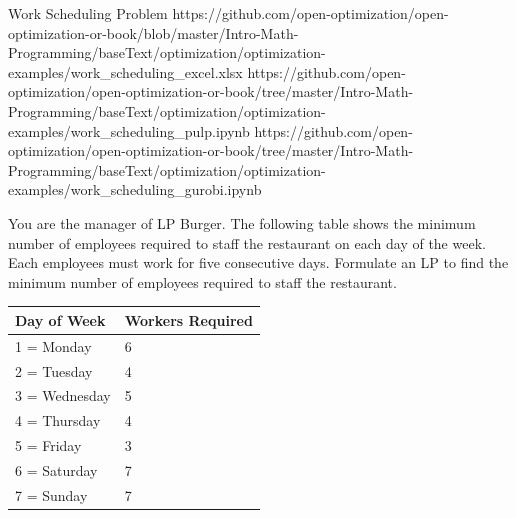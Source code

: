 \begin{examplewithallcode}{Work Scheduling Problem}
{https://github.com/open-optimization/open-optimization-or-book/blob/master/Intro-Math-Programming/baseText/optimization/optimization-examples/work_scheduling_excel.xlsx}
{https://github.com/open-optimization/open-optimization-or-book/tree/master/Intro-Math-Programming/baseText/optimization/optimization-examples/work_scheduling_pulp.ipynb}
{https://github.com/open-optimization/open-optimization-or-book/tree/master/Intro-Math-Programming/baseText/optimization/optimization-examples/work_scheduling_gurobi.ipynb}

You are the manager of LP Burger. The following table shows the minimum number of employees required to staff the restaurant on each day of the week. Each employees must work for five consecutive days. Formulate an LP to find the minimum number of employees required to staff the restaurant.

\end{examplewithallcode}

\begin{table}[h!] \begin{center} \begin{tabular} {|l|l|} 
\hline Day of Week & Workers Required   \\ \hline
\hline  1 = Monday & 6  \\
\hline  2 = Tuesday & 4  \\
\hline  3 = Wednesday & 5  \\
\hline  4 = Thursday & 4  \\
\hline  5 = Friday & 3  \\
\hline  6 = Saturday & 7  \\
\hline  7 = Sunday & 7  \\
\hline \end{tabular} \end{center} \end{table}


